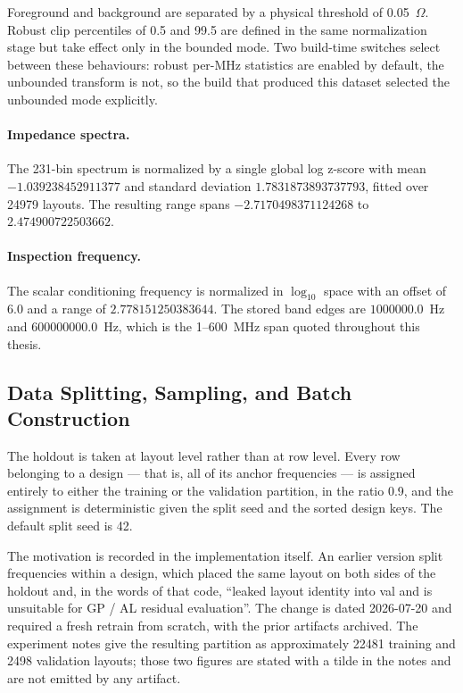 Foreground and background are separated by a physical threshold of 0.05~$\Omega$. Robust clip
percentiles of 0.5 and 99.5 are defined in the same normalization stage but take effect only in the
bounded mode. Two build-time switches select between these behaviours: robust per-MHz statistics are
enabled by default, the unbounded transform is not, so the build that produced this dataset selected
the unbounded mode explicitly.

\paragraph{Impedance spectra.} The 231-bin spectrum is normalized by a single global log z-score with
mean $-1.039238452911377$ and standard deviation $1.7831873893737793$, fitted over 24979 layouts. The
resulting range spans $-2.7170498371124268$ to $2.474900722503662$.

\paragraph{Inspection frequency.} The scalar conditioning frequency is normalized in $\log_{10}$
space with an offset of $6.0$ and a range of $2.778151250383644$. The stored band edges are
$1000000.0$~Hz and $600000000.0$~Hz, which is the 1--600~MHz span quoted throughout this thesis.


\subsection{Data Splitting, Sampling, and Batch Construction}
\label{subsec:data_splitting_sampling}

The holdout is taken at layout level rather than at row level. Every row belonging to a design ---
that is, all of its anchor frequencies --- is assigned entirely to either the training or the
validation partition, in the ratio 0.9, and the assignment is deterministic given the split seed and
the sorted design keys. The default split seed is 42.

The motivation is recorded in the implementation itself. An earlier version split frequencies within
a design, which placed the same layout on both sides of the holdout and, in the words of that code,
``leaked layout identity into val and is unsuitable for GP / AL residual evaluation''. The change is
dated 2026-07-20 and required a fresh retrain from scratch, with the prior artifacts archived. The
experiment notes give the resulting partition as approximately 22481 training and 2498 validation
layouts; those two figures are stated with a tilde in the notes and are not emitted by any artifact.

